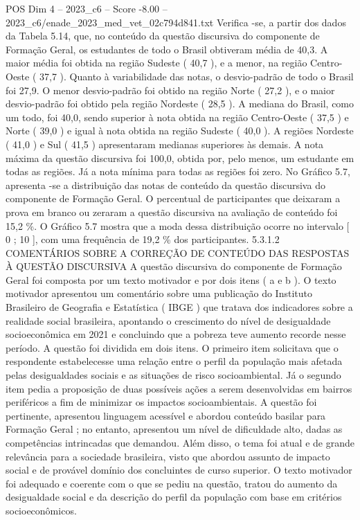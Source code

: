\begin{textsample}{POS Dim 4 – 2023\_c6 – Score -8.00 – 2023\_c6/enade\_2023\_med\_vet\_02c794d841.txt}
Verifica -se, a partir dos dados da Tabela 5.14, que, no conteúdo da questão discursiva do componente de Formação Geral, os estudantes de todo o Brasil obtiveram média de 40,3.
A maior média foi obtida na região Sudeste ( 40,7 ), e a menor, na região Centro-Oeste ( 37,7 ).
Quanto à variabilidade das notas, o desvio-padrão de todo o Brasil foi 27,9.
O menor desvio-padrão foi obtido na região Norte ( 27,2 ), e o maior desvio-padrão foi obtido pela região Nordeste ( 28,5 ).
A mediana do Brasil, como um todo, foi 40,0, sendo superior à nota obtida na região Centro-Oeste ( 37,5 ) e Norte ( 39,0 ) e igual à nota obtida na região Sudeste ( 40,0 ).
A regiões Nordeste ( 41,0 ) e Sul ( 41,5 ) apresentaram medianas superiores às demais.
A nota máxima da questão discursiva foi 100,0, obtida por, pelo menos, um estudante em todas as regiões.
Já a nota mínima para todas as regiões foi zero.
No Gráfico 5.7, apresenta -se a distribuição das notas de conteúdo da questão discursiva do componente de Formação Geral.
O percentual de participantes que deixaram a prova em branco ou zeraram a questão discursiva na avaliação de conteúdo foi 15,2 \%.
O Gráfico 5.7 mostra que a moda dessa distribuição ocorre no intervalo [ 0 ; 10 ], com uma frequência de 19,2 \% dos participantes. 5.3.1.2 COMENTÁRIOS SOBRE A CORREÇÃO DE CONTEÚDO DAS RESPOSTAS À QUESTÃO DISCURSIVA A questão discursiva do componente de Formação Geral foi composta por um texto motivador e por dois itens ( a e b ).
O texto motivador apresentou um comentário sobre uma publicação do Instituto Brasileiro de Geografia e Estatística ( IBGE ) que tratava dos indicadores sobre a realidade social brasileira, apontando o crescimento do nível de desigualdade socioeconômica em 2021 e concluindo que a pobreza teve aumento recorde nesse período.
A questão foi dividida em dois itens.
O primeiro item solicitava que o respondente estabelecesse uma relação entre o perfil da população mais afetada pelas desigualdades sociais e as situações de risco socioambiental.
Já o segundo item pedia a proposição de duas possíveis ações a serem desenvolvidas em bairros periféricos a fim de minimizar os impactos socioambientais.
A questão foi pertinente, apresentou linguagem acessível e abordou conteúdo basilar para Formação Geral ; no entanto, apresentou um nível de dificuldade alto, dadas as competências intrincadas que demandou.
Além disso, o tema foi atual e de grande relevância para a sociedade brasileira, visto que abordou assunto de impacto social e de provável domínio dos concluintes de curso superior.
O texto motivador foi adequado e coerente com o que se pediu na questão, tratou do aumento da desigualdade social e da descrição do perfil da população com base em critérios socioeconômicos.

\end{textsample}
